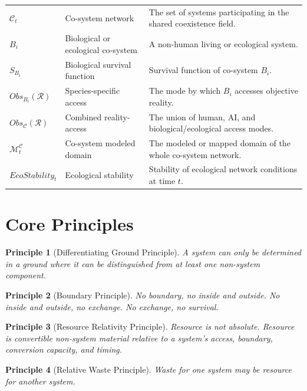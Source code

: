 \documentclass[11pt,a4paper]{article}
\newtheorem{principle}{Principle}
\begin{document}
\begin{longtable}{p{}p{}p{}}
$\mathcal{C}_t$ & Co-system network & The set of systems participating in the shared coexistence field. \\

$B_i$ & Biological or ecological co-system & A non-human living or ecological system. \\

$S_{B_i}$ & Biological survival function & Survival function of co-system $B_i$. \\

$Obs_{B_i}(\mathcal{R})$ & Species-specific access & The mode by which $B_i$ accesses objective reality. \\

$Obs_{\mathcal{C}}(\mathcal{R})$ & Combined reality-access & The union of human, AI, and biological/ecological access modes. \\

$\mathcal{M}_t^{\mathcal{C}}$ & Co-system modeled domain & The modeled or mapped domain of the whole co-system network. \\

$EcoStability_t$ & Ecological stability & Stability of ecological network conditions at time $t$. \\

\bottomrule
\end{longtable}

\section{Core Principles}

\begin{principle}[Differentiating Ground Principle]
A system can only be determined in a ground where it can be distinguished from at least one non-system component.
\end{principle}

\begin{principle}[Boundary Principle]
No boundary, no inside and outside. No inside and outside, no exchange. No exchange, no survival.
\end{principle}

\begin{principle}[Resource Relativity Principle]
Resource is not absolute. Resource is convertible non-system material relative to a system's access, boundary, conversion capacity, and timing.
\end{principle}

\begin{principle}[Relative Waste Principle]
Waste for one system may be resource for another system.
\end{principle}
\end{document}
